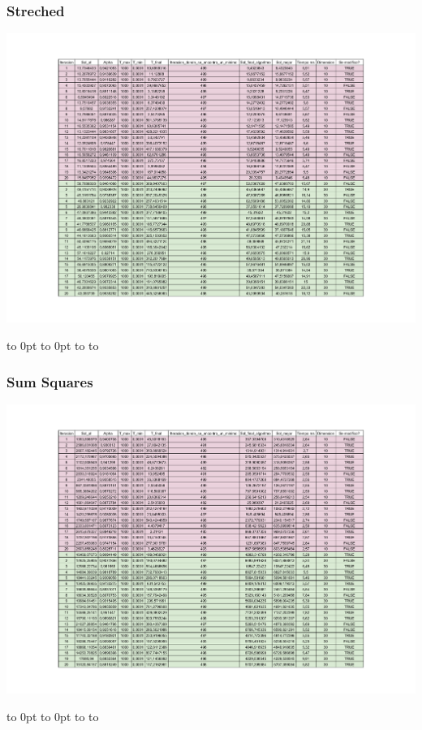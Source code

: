 \documentclass[10pt]{article}
\def\fillandplacepagenumber{%
 \par\pagestyle{empty}%
 \vbox to 0pt{\vss}\vfill
 \vbox to 0pt{\baselineskip0pt
   \hbox to\linewidth{\hss}%
   \baselineskip\footskip
   \hbox to\linewidth{%
     \hfil\thepage\hfil}\vss}}
\begin{document}
\begin{landscape}
  \subsubsection{Streched}
  \begin{center}
    \includegraphics[scale=0.7]{docs/RMHC_SA_Metaheuristics-SA_Streched.pdf}
  \end{center}
  \fillandplacepagenumber
  \subsubsection{Sum Squares}
  \begin{center}
    \includegraphics[scale=0.7]{docs/RMHC_SA_Metaheuristics-SA_SumSquare.pdf}
  \end{center}
  \fillandplacepagenumber
\end{landscape}
\end{document}
